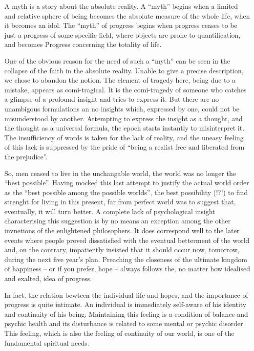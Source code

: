 A myth is a story about the absolute reality.
A ``myth'' begins when a limited and relative sphere of being becomes the 
absolute measure of the whole life, when it becomes an idol.
The ``myth'' of progress begins when progress ceases to be just a progress
of some specific field, where objects are prone to quantification, and becomes
Progress concerning the totality of life.

One of the obvious reason for the need of such a ``myth'' can be seen in the 
collapse of the faith in the absolute reality. Unable to give a precise description,
we chose to abandon the notion.
The element of tragedy here, being due to a mistake, appears as 
comi-tragical. It is the comi-tragedy of someone who catches a glimpse of a 
profound insight and tries to express it. But there are no unambigous 
formulations an no insights which, expressed by one, could not be misunderstood
by another. Attempting to express the insight as a thought, and the thought as a
universal formula, the epoch starts instantly to misinterpret it. The insufficiency 
of words is taken for the lack of reality, and
the uneasy feeling of this lack is suppressed by the 
pride of ``being a realist free and liberated from the prejudice''.

So, men ceased to live in the 
unchangable world, the world was no longer the ``best possible''.
Having mocked this last attempt to justify the actual world order as
the ``best possible among the possible worlds'', the best possibility (!?!)
 to find strenght for living in this present, far from perfect
world was to suggest that, eventually, it will turn better. 
A complete lack of psychological insight characterising this suggestion is by
no means an exception among the other invnetions of the enlightened 
philosophers. It does correspond well to the later events where people proved
dissatisfied with the eventual betterment of the world and, on the contrary,
impatiently insisted that it should occur now, tomorrow, during the next five
year's plan. Preaching the closeness of the ultimate kingdom of happiness 
-- or if you prefer, hope --
always follows the, no matter how idealised and exalted, idea of progress.

In fact, the relation bewteen the individual life and hopes, and the importance
of progress is quite intimate. An individual is immediately self-aware of his
identity and continuity of his being. Maintaining this feeling is a condition
of balance and psychic health and its disturbance is related to
some mental or psychic disorder. This feeling, which is also the feeling
of continuity of our world, is one of the fundamental spiritual needs.

